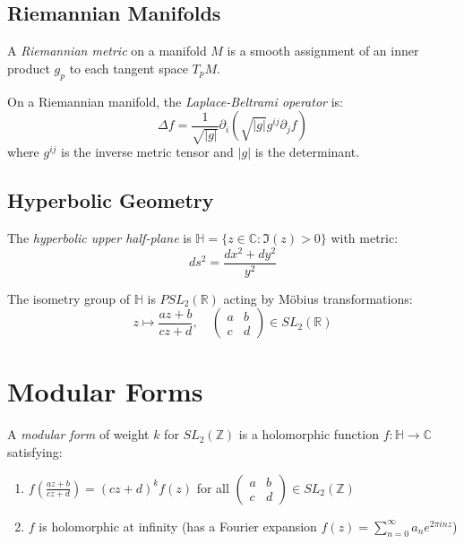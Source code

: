 \subsection{Riemannian Manifolds}

\begin{definition}
A \emph{Riemannian metric} on a manifold $M$ is a smooth assignment of an inner product $g_p$ to each tangent space $T_pM$.
\end{definition}

\begin{definition}
On a Riemannian manifold, the \emph{Laplace-Beltrami operator} is:
\[
\Delta f = \frac{1}{\sqrt{|g|}} \partial_i \left( \sqrt{|g|} g^{ij} \partial_j f \right)
\]
where $g^{ij}$ is the inverse metric tensor and $|g|$ is the determinant.
\end{definition}

\subsection{Hyperbolic Geometry}

\begin{definition}
The \emph{hyperbolic upper half-plane} is $\mathbb{H} = \{z \in \mathbb{C} : \Im(z) > 0\}$ with metric:
\[
ds^2 = \frac{dx^2 + dy^2}{y^2}
\]
\end{definition}

\begin{theorem}
The isometry group of $\mathbb{H}$ is $PSL_2(\mathbb{R})$ acting by Möbius transformations:
\[
z \mapsto \frac{az + b}{cz + d}, \quad \begin{pmatrix} a & b \\ c & d \end{pmatrix} \in SL_2(\mathbb{R})
\]
\end{theorem}

\section{Modular Forms}

\begin{definition}
A \emph{modular form} of weight $k$ for $SL_2(\mathbb{Z})$ is a holomorphic function $f: \mathbb{H} \to \mathbb{C}$ satisfying:
\begin{enumerate}
\item $f\left(\frac{az + b}{cz + d}\right) = (cz + d)^k f(z)$ for all $\begin{pmatrix} a & b \\ c & d \end{pmatrix} \in SL_2(\mathbb{Z})$
\item $f$ is holomorphic at infinity (has a Fourier expansion $f(z) = \sum_{n=0}^{\infty} a_n e^{2\pi i nz}$)
\end{enumerate}
\end{definition}

